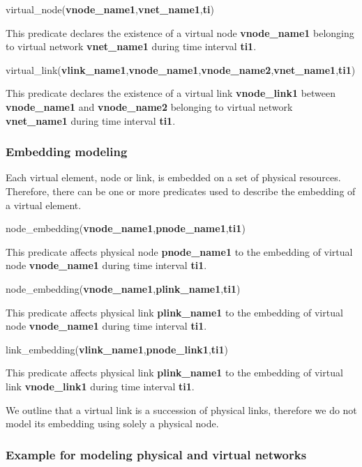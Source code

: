 virtual\_node(\textbf{vnode\_name1},\textbf{vnet\_name1},\textbf{ti})

This predicate declares the existence of a virtual node \textbf{vnode\_name1} belonging to virtual network \textbf{vnet\_name1} during time interval \textbf{ti1}.

virtual\_link(\textbf{vlink\_name1},\textbf{vnode\_name1},\textbf{vnode\_name2},\textbf{vnet\_name1},\textbf{ti1})

This predicate declares the existence of a virtual link \textbf{vnode\_link1} between \textbf{vnode\_name1} and \textbf{vnode\_name2} belonging to virtual network \textbf{vnet\_name1} during time interval \textbf{ti1}.


\subsubsection{Embedding modeling}
Each virtual element, node or link, is embedded on a set of physical resources.
Therefore, there can be one or more predicates used to describe the embedding of a virtual element.


node\_embedding(\textbf{vnode\_name1},\textbf{pnode\_name1},\textbf{ti1})

This predicate affects physical node \textbf{pnode\_name1} to the embedding of virtual node \textbf{vnode\_name1} during time interval \textbf{ti1}.

node\_embedding(\textbf{vnode\_name1},\textbf{plink\_name1},\textbf{ti1})

This predicate affects physical link \textbf{plink\_name1} to the embedding of virtual node \textbf{vnode\_name1} during time interval \textbf{ti1}.

link\_embedding(\textbf{vlink\_name1},\textbf{pnode\_link1},\textbf{ti1})

This predicate affects physical link \textbf{plink\_name1} to the embedding of virtual link \textbf{vnode\_link1} during time interval \textbf{ti1}.

We outline that a virtual link is a succession of physical links, therefore we do not model its embedding using solely a physical node.


\subsubsection{Example for modeling physical and virtual networks}

